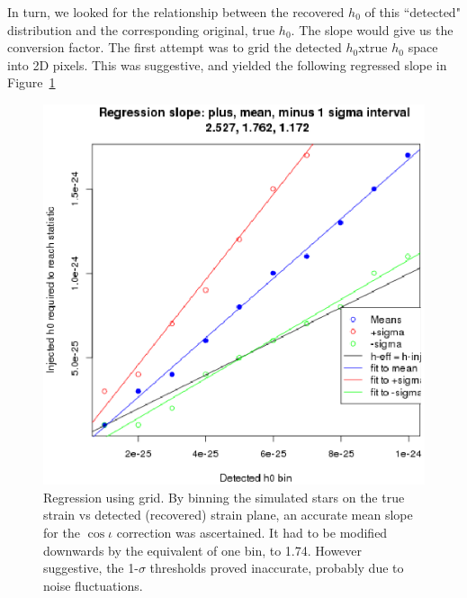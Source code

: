 In turn, we looked for the relationship between the recovered $h_0$ of this ``detected" distribution and the corresponding original, true $h_0$. The slope would give us the conversion factor. The first attempt was to grid the {detected $h_0$}x{true $h_0$} space into 2D pixels. This was suggestive, and yielded the following regressed slope in Figure~\ref{fig:plotheffvsh0trueregressions}

\begin{figure}
\begin{center}
\includegraphics[width=0.3\paperwidth,height=0.2\paperheight]{PlotHeffVsH0TrueRegressions.eps}
\caption{Regression using grid. By binning the simulated stars on the true strain vs detected (recovered) strain plane, an accurate mean slope for the $\cos \iota$ correction was ascertained. It had to be modified downwards by the equivalent of one bin, to 1.74. However suggestive, the 1-$\sigma$ thresholds proved inaccurate, probably due to noise fluctuations.
\label{fig:plotheffvsh0trueregressions}}
\end{center}
\end{figure}


